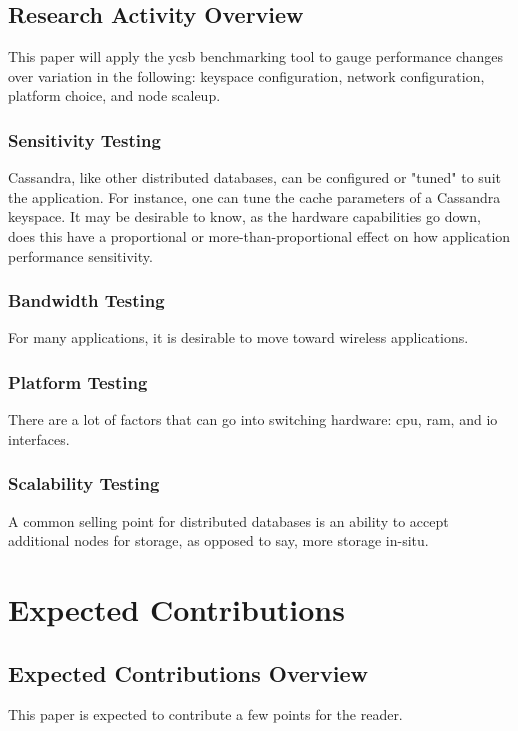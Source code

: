 \subsection{Research Activity Overview}
This paper will apply the \gls{ycsb} benchmarking tool to gauge performance changes over variation in the following: keyspace configuration, network configuration, platform choice, and node scaleup.
\subsubsection{Sensitivity Testing}
Cassandra, like other distributed databases, can be configured or "tuned" to suit the application.
For instance, one can tune the cache parameters of a Cassandra keyspace.
It may be desirable to know, as the hardware capabilities go down, does this have a proportional or more-than-proportional effect on how application performance sensitivity.
\subsubsection{Bandwidth Testing}
For many applications, it is desirable to move toward wireless applications.

\subsubsection{Platform Testing}
There are a lot of factors that can go into switching hardware: \gls{cpu}, \gls{ram}, and \gls{io} interfaces.

\subsubsection{Scalability Testing}
A common selling point for distributed databases is an ability to accept additional nodes for storage, as opposed to say, more storage in-situ.

\section{Expected Contributions}
\subsection{Expected Contributions Overview}
This paper is expected to contribute a few points for the reader.
